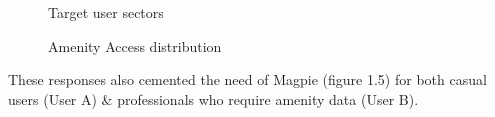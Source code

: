 \documentclass{report}
\begin{document}
\begin{figure}
    \centering
    \begin{minipage}{0.45\textwidth}
        \centering
        \caption{Target user sectors}
        \label{fig:plot1}
    \end{minipage}
    \hfill
    \begin{minipage}{0.45\textwidth}
        \centering
        \caption{Amenity Access distribution}
        \label{fig:plot2}
    \end{minipage}
\end{figure}
These responses also cemented the need of Magpie (figure 1.5) for both casual users (User A) \& professionals who require amenity data (User B).
\end{document}
